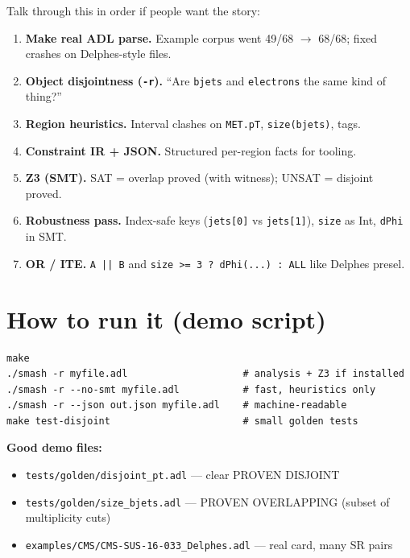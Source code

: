 \documentclass[11pt,a4paper]{article}
\begin{document}
Talk through this in order if people want the story:

\begin{enumerate}
  \item \textbf{Make real ADL parse.} Example corpus went 49/68 $\rightarrow$ 68/68;
        fixed crashes on Delphes-style files.
  \item \textbf{Object disjointness (\texttt{-r}).} ``Are \texttt{bjets} and \texttt{electrons}
        the same kind of thing?''
  \item \textbf{Region heuristics.} Interval clashes on \texttt{MET.pT}, \texttt{size(bjets)}, tags.
  \item \textbf{Constraint IR + JSON.} Structured per-region facts for tooling.
  \item \textbf{Z3 (SMT).} SAT = overlap proved (with witness); UNSAT = disjoint proved.
  \item \textbf{Robustness pass.} Index-safe keys (\texttt{jets[0]} vs \texttt{jets[1]}),
        \texttt{size} as Int, \texttt{dPhi} in SMT.
  \item \textbf{OR / ITE.} \texttt{A || B} and \texttt{size >= 3 ? dPhi(...) : ALL} like Delphes presel.
\end{enumerate}

\section{How to run it (demo script)}

\begin{lstlisting}
make
./smash -r myfile.adl                    # analysis + Z3 if installed
./smash -r --no-smt myfile.adl           # fast, heuristics only
./smash -r --json out.json myfile.adl    # machine-readable
make test-disjoint                       # small golden tests
\end{lstlisting}

\textbf{Good demo files:}
\begin{itemize}
  \item \texttt{tests/golden/disjoint\_pt.adl} --- clear PROVEN DISJOINT
  \item \texttt{tests/golden/size\_bjets.adl} --- PROVEN OVERLAPPING (subset of multiplicity cuts)
  \item \texttt{examples/CMS/CMS-SUS-16-033\_Delphes.adl} --- real card, many SR pairs
\end{itemize}
\end{document}
